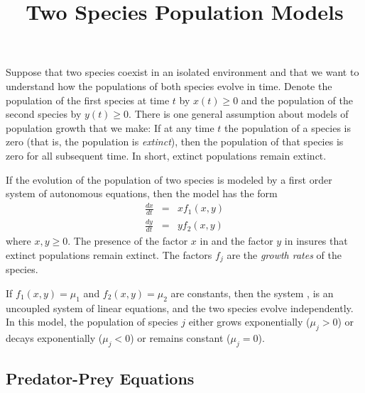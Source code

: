 \documentclass{ximera}
\title{Two Species Population Models}
\begin{document}
\begin{abstract}
\end{abstract}
\maketitle


\label{S:TSPM} 

Suppose that two species coexist in an isolated environment and
that we want to understand how the populations of both species
evolve in time.  Denote the population of the first species at time 
$t$ by $x(t)\ge 0$ and the population of the second species
by $y(t)\ge 0$.  There is one general assumption about models of
population growth that we make: If at any time $t$ the
population of a species is zero (that is, the population is {\em
extinct\/}), then the population of that species is zero for all
subsequent time.  In short, extinct populations remain extinct.

If the evolution of the population of two species is modeled by a
first order system of autonomous equations, then the model has the form
\begin{eqnarray}
\frac{dx}{dt} & = & xf_1(x,y) \label{e:pop1a} \\
\frac{dy}{dt} & = & yf_2(x,y) \label{e:pop1b}
\end{eqnarray}  
where $x,y \ge 0$.
The presence of the factor $x$ in  and the factor
$y$ in  insures that extinct populations remain
extinct. The factors $f_j$ are the {\em growth rates\/} of the 
species.

If $f_1(x,y) = \mu_1$ and $f_2(x,y)=\mu_2$ are constants, then 
the system , is an uncoupled system 
of linear equations, and the two species evolve independently.  
In this model, the population of species $j$ either grows
exponentially ($\mu_j>0$) or decays exponentially ($\mu_j<0$)
or remains constant ($\mu_j=0$).


\subsection*{Predator-Prey Equations}
\end{document}
